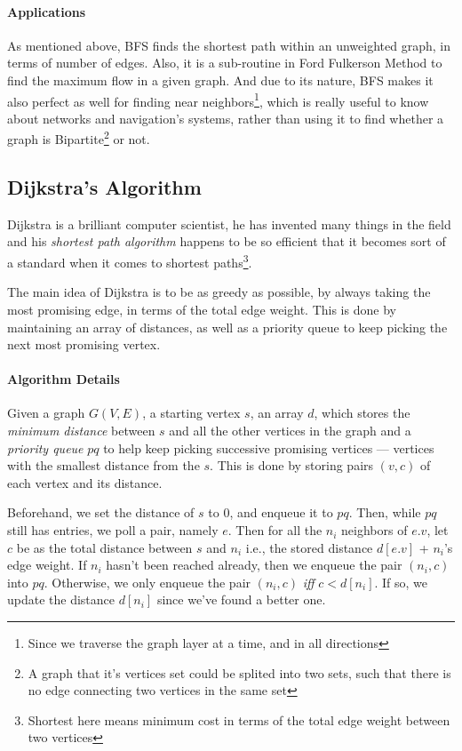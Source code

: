 \documentclass[12pt]{article}
\begin{document}
\paragraph{Applications} As mentioned above, BFS finds the shortest path within  an unweighted graph, in terms of number of edges. Also, it is a sub-routine in Ford Fulkerson Method to find the maximum flow in a given graph. And due to its nature, BFS makes it also perfect as well for finding near neighbors\footnote{Since we traverse the graph layer at a time, and in all directions}, which is really useful to know about networks and navigation's systems, rather than using it to find whether a graph is Bipartite\footnote{A graph that it's vertices set could be splited into two sets, such that there is no edge connecting two vertices in the same set} or not.

\subsection{Dijkstra's Algorithm}

Dijkstra is a brilliant computer scientist, he has invented many things in the field and his \textit{shortest path algorithm} happens to be so efficient that it becomes sort of a standard when it comes to shortest paths\footnote{Shortest here means minimum cost in terms of the total edge weight between two vertices}.

The main idea of Dijkstra is to be as greedy as possible, by always taking the most promising edge, in terms of the total edge weight. This is done by maintaining an array of distances, as well as a priority queue to keep picking the next most promising vertex.

\paragraph{Algorithm Details} Given a graph $G(V,E)$, a starting vertex $s$, an array $d$, which stores the \textit{minimum distance} between $s$ and all the other vertices in the graph and a \textit{priority queue} $pq$ to help keep picking successive promising vertices ---  vertices with the smallest distance from the $s$. This is done by storing pairs $(v,c)$ of each vertex and its distance.

Beforehand, we set the distance of $s$ to $0$, and enqueue it to $pq$. Then, while $pq$ still has entries, we poll a pair, namely $e$. Then for all the $n_i$ neighbors of $e.v$, let $c$ be as the total distance between $s$ and $n_i$ i.e., the stored distance $d[e.v]$ + $n_i$'s edge weight. If $n_i$ hasn't been reached already, then we enqueue the pair $(n_i,c)$ into $pq$. Otherwise, we only enqueue the pair $(n_i,c)$ \textit{iff} $c < d[n_i]$. If so, we update the distance $d[n_i]$ since we've found a better one.
\end{document}
